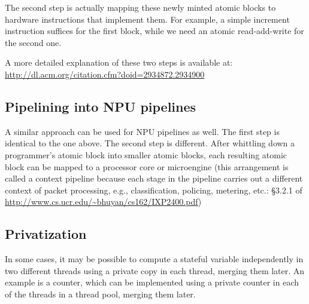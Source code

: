 The second step is actually mapping these newly minted atomic blocks to
hardware instructions that implement them. For example, a simple increment
instruction suffices for the first block, while we need an atomic
read-add-write for the second one.

A more detailed explanation of these two steps is available at:
\url{http://dl.acm.org/citation.cfm?doid=2934872.2934900}

\subsection{Pipelining into NPU pipelines}
A similar approach can be used for NPU pipelines as well. The first step is
identical to the one above. The second step is different. After whittling down
a programmer's atomic block into smaller atomic blocks, each resulting atomic
block can be mapped to a processor core or microengine (this arrangement is
called a context pipeline because each stage in the pipeline carries out a
different context of packet processing, e.g., classification, policing,
metering, etc.: \S3.2.1 of
\url{http://www.cs.ucr.edu/~bhuyan/cs162/IXP2400.pdf})

\subsection{Privatization}

In some cases, it may be possible to compute a stateful variable independently
in two different threads using a private copy in each thread, merging them
later. An example is a counter, which can be implemented using a private
counter in each of the threads in a thread pool, merging them later.

